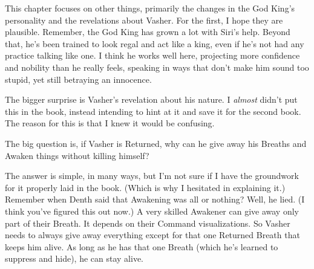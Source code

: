 This chapter focuses on other things, primarily the changes in the God King’s personality and the revelations about Vasher. For the first, I hope they are plausible. Remember, the God King has grown a lot with Siri’s help. Beyond that, he’s been trained to look regal and act like a king, even if he’s not had any practice talking like one. I think he works well here, projecting more confidence and nobility than he really feels, speaking in ways that don’t make him sound too stupid, yet still betraying an innocence.

The bigger surprise is Vasher’s revelation about his nature. I \textit{almost} didn’t put this in the book, instead intending to hint at it and save it for the second book. The reason for this is that I knew it would be confusing.

The big question is, if Vasher is Returned, why can he give away his Breaths and Awaken things without killing himself?

The answer is simple, in many ways, but I’m not sure if I have the groundwork for it properly laid in the book. (Which is why I hesitated in explaining it.) Remember when Denth said that Awakening was all or nothing? Well, he lied. (I think you’ve figured this out now.) A very skilled Awakener can give away only part of their Breath. It depends on their Command visualizations. So Vasher needs to always give away everything except for that one Returned Breath that keeps him alive. As long as he has that one Breath (which he’s learned to suppress and hide), he can stay alive.



